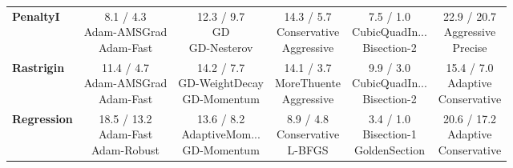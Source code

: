 \documentclass{article}
\begin{document}
\begin{longtable}{lccccc}
\textbf{PenaltyI} &  \makecell{8.1 / 4.3 \\ \scriptsize{Adam-AMSGrad} \\ \scriptsize{Adam-Fast}}&  \makecell{12.3 / 9.7 \\ \scriptsize{GD} \\ \scriptsize{GD-Nesterov}}&  \makecell{14.3 / 5.7 \\ \scriptsize{Conservative} \\ \scriptsize{Aggressive}}& \cellcolor{green!20} \makecell{7.5 / 1.0 \\ \scriptsize{CubicQuadIn...} \\ \scriptsize{Bisection-2}}& \cellcolor{red!15} \makecell{22.9 / 20.7 \\ \scriptsize{Aggressive} \\ \scriptsize{Precise}} \\
\textbf{Rastrigin} &  \makecell{11.4 / 4.7 \\ \scriptsize{Adam-AMSGrad} \\ \scriptsize{Adam-Fast}}&  \makecell{14.2 / 7.7 \\ \scriptsize{GD-WeightDecay} \\ \scriptsize{GD-Momentum}}&  \makecell{14.1 / 3.7 \\ \scriptsize{MoreThuente} \\ \scriptsize{Aggressive}}& \cellcolor{green!20} \makecell{9.9 / 3.0 \\ \scriptsize{CubicQuadIn...} \\ \scriptsize{Bisection-2}}& \cellcolor{red!15} \makecell{15.4 / 7.0 \\ \scriptsize{Adaptive} \\ \scriptsize{Conservative}} \\
\textbf{Regression} &  \makecell{18.5 / 13.2 \\ \scriptsize{Adam-Fast} \\ \scriptsize{Adam-Robust}}&  \makecell{13.6 / 8.2 \\ \scriptsize{AdaptiveMom...} \\ \scriptsize{GD-Momentum}}&  \makecell{8.9 / 4.8 \\ \scriptsize{Conservative} \\ \scriptsize{L-BFGS}}& \cellcolor{green!20} \makecell{3.4 / 1.0 \\ \scriptsize{Bisection-1} \\ \scriptsize{GoldenSection}}& \cellcolor{red!15} \makecell{20.6 / 17.2 \\ \scriptsize{Adaptive} \\ \scriptsize{Conservative}} \\

\end{longtable}
\end{document}
